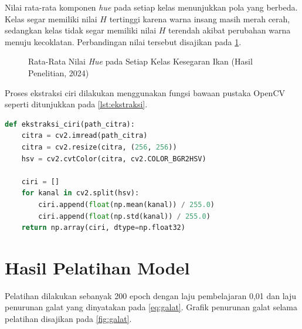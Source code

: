 Nilai rata-rata komponen \textit{hue} pada setiap kelas menunjukkan pola
yang berbeda. Kelas segar memiliki nilai $H$ tertinggi karena warna
insang masih merah cerah, sedangkan kelas tidak segar memiliki nilai
$H$ terendah akibat perubahan warna menuju kecoklatan. Perbandingan
nilai tersebut disajikan pada \cref{fig:ratahue}.

\begin{figure}[H]
\centering
{}
\caption{Rata-Rata Nilai \textit{Hue} pada Setiap Kelas Kesegaran Ikan (Hasil Penelitian, 2024)}
\label{fig:ratahue}
\end{figure}

Proses ekstraksi ciri dilakukan menggunakan fungsi bawaan pustaka
OpenCV seperti ditunjukkan pada \cref{lst:ekstraksi}.

\begin{lstlisting}[language=Python, caption={Fungsi Ekstraksi Ciri Warna pada Ruang HSV}, label={lst:ekstraksi}]
def ekstraksi_ciri(path_citra):
    citra = cv2.imread(path_citra)
    citra = cv2.resize(citra, (256, 256))
    hsv = cv2.cvtColor(citra, cv2.COLOR_BGR2HSV)

    ciri = []
    for kanal in cv2.split(hsv):
        ciri.append(float(np.mean(kanal)) / 255.0)
        ciri.append(float(np.std(kanal)) / 255.0)
    return np.array(ciri, dtype=np.float32)
\end{lstlisting}

\section{Hasil Pelatihan Model}

Pelatihan dilakukan sebanyak 200 epoch dengan laju pembelajaran 0,01
dan laju penurunan galat yang dinyatakan pada \cref{eq:galat}. Grafik
penurunan galat selama pelatihan disajikan pada \cref{fig:galat}.

